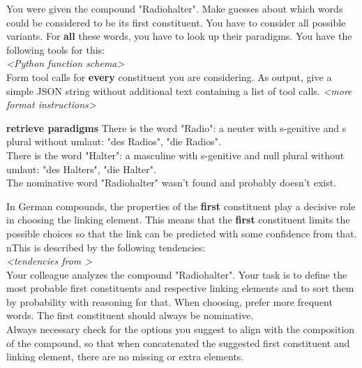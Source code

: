 \documentclass[11pt]{article}
\begin{document}
\begin{center}
    \begin{tcolorbox}[colback=gray!10, colframe=black, width=\linewidth, left=1mm, right=1mm, title=Prediction of \texttt{radio\_halter} from \textit{Llama-instruct\textsubscript{+cand+par}}, breakable] %
    
        \begin{humanmessage}
            You were given the compound "Radiohalter". Make guesses about which words could be considered to be its first constituent. You have to consider all possible variants. For \textbf{all} these words, you have to look up their paradigms. You have the following tools for this: \\
            
            \textit{<Python function schema>} \\
            
            Form tool calls for \textbf{every} constituent you are considering. As output, give a simple JSON string without additional text containing a list of tool calls. \textit{<more format instructions>}
        \end{humanmessage}

        \begin{toolmessage}{\textbf{retrieve paradigms}}
            There is the word "Radio": a neuter with s-genitive and s plural without umlaut: "des Radios", "die Radios". \\
            There is the word "Halter": a masculine with s-genitive and null plural without umlaut: "des Halters", "die Halter". \\
            The nominative word "Radiohalter" wasn't found and probably doesn't exist.
        \end{toolmessage}

        \begin{humanmessage}
            In German compounds, the properties of the \textbf{first} constituent play a decisive role in choosing the linking element. This means that the \textbf{first} constituent limits the possible choices so that the link can be predicted with some confidence from that. \\
            nThis is described by the following tendencies: \\
            
            \textit{<tendencies from >} \\
            
            Your colleague analyzes the compound "Radiohalter". Your task is to define the most probable first constituents and respective linking elements and to sort them by probability with reasoning for that. When choosing, prefer more frequent words. The first constituent should always be nominative. \\
            Always necessary check for the options you suggest to align with the composition of the compound, so that when concatenated the suggested first constituent and linking element, there are no missing or extra elements. \\
            

\end{humanmessage}
\end{tcolorbox}
\end{center}
\end{document}

